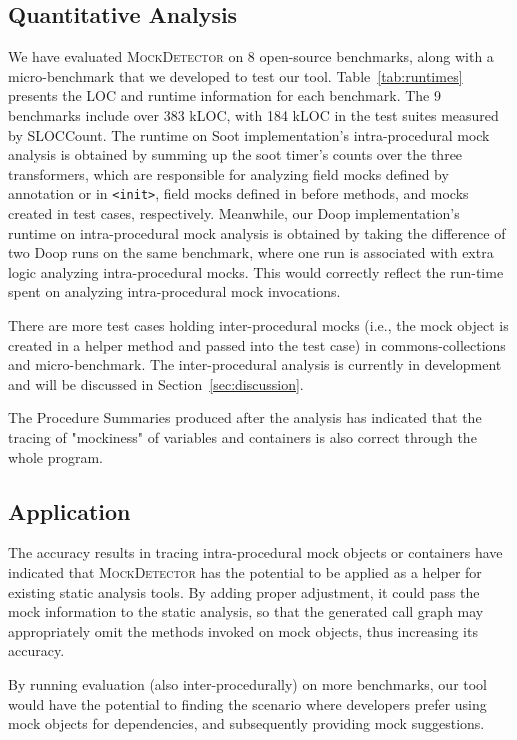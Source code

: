 \subsection{Quantitative Analysis}
\label{subsec:effectiveness}

We have evaluated \textsc{MockDetector} on 8 open-source benchmarks, along with a micro-benchmark that we developed to test our tool. Table~\ref{tab:runtimes} presents the LOC and runtime information for each benchmark. The 9 benchmarks include over 383 kLOC, with 184 kLOC in the test suites measured by SLOCCount. The runtime on Soot implementation's intra-procedural mock analysis  is obtained by summing up the soot timer's counts over the three transformers, which are responsible for analyzing field mocks defined by annotation or in \texttt{<init>}, field mocks defined in before methods, and mocks created in test cases, respectively. Meanwhile, our Doop implementation's runtime on intra-procedural mock analysis is obtained by taking the difference of two Doop runs on the same benchmark, where one run is associated with extra logic analyzing intra-procedural mocks. This would correctly reflect the run-time spent on analyzing intra-procedural mock invocations.  %

There are more test cases holding inter-procedural mocks (i.e., the mock object is created in a helper method and passed into the test case) in commons-collections and micro-benchmark. The inter-procedural analysis is currently in development and will be discussed in Section~\ref{sec:discussion}.

The Procedure Summaries produced after the analysis has indicated that the tracing of "mockiness" of variables and containers is also correct through the whole program. 

\subsection{Application}
\label{subsec:static}

The accuracy results in tracing intra-procedural mock objects or containers have indicated that \textsc{MockDetector} has the potential to be applied as a helper for existing static analysis tools. By adding proper adjustment, it could pass the mock information to the static analysis, so that the generated call graph may appropriately omit the methods invoked on mock objects, thus increasing its accuracy.

By running evaluation (also inter-procedurally) on more benchmarks, our tool would have the potential to finding the scenario where developers prefer using mock objects for dependencies, and subsequently providing mock suggestions.
